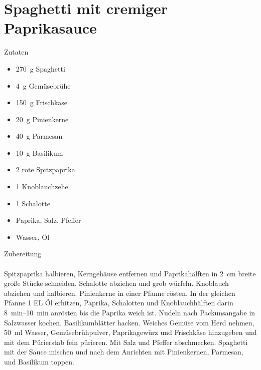 \section*{Spaghetti mit cremiger Paprikasauce}
\ihead{}\ohead{}
\cfoot{}
{\Large Zutaten}
\begin{multicols}{2}
\begin{itemize}
    \item \SI{270}{g} Spaghetti
    \item \SI{4}{g} Gemüsebrühe
    \item \SI{150}{g} Frischkäse
    \item \SI{20}{g} Pinienkerne
    \item \SI{40}{g} Parmesan 
    \item \SI{10}{g} Basilikum
    \item \num{2} rote Spitzpaprika
    \item \num{1} Knoblauchzehe
    \item \num{1} Schalotte
    \item Paprika, Salz, Pfeffer
    \item Wasser, Öl
\end{itemize}
\end{multicols}
\noindent
{\Large Zubereitung}\\
\\
Spitzpaprika halbieren, Kerngehäuse entfernen und Paprikahälften in \SI{2}{cm} breite große Stücke schneiden.
Schalotte abziehen und grob würfeln.
Knoblauch abziehen und halbieren.
Pinienkerne in einer Pfanne rösten. 
In der gleichen Pfanne \num{1} EL Öl erhitzen, Paprika, Schalotten und Knoblauchhälften darin \SIrange{8}{10}{min} anrösten bis die Paprika weich ist.
Nudeln nach Packunsangabe in Salzwasser kochen. 
Basilikumblätter hacken. 
Weiches Gemüse vom Herd nehmen, \SI{50}{ml} Wasser, Gemüsebrühpulver, Paprikagewürz und Frischkäse hinzugeben und mit dem Pürierstab fein pürieren. 
Mit Salz und Pfeffer abschmecken.
Spaghetti mit der Sauce mischen und nach dem Anrichten mit Pinienkernen, Parmesan, und Basilikum toppen. 
